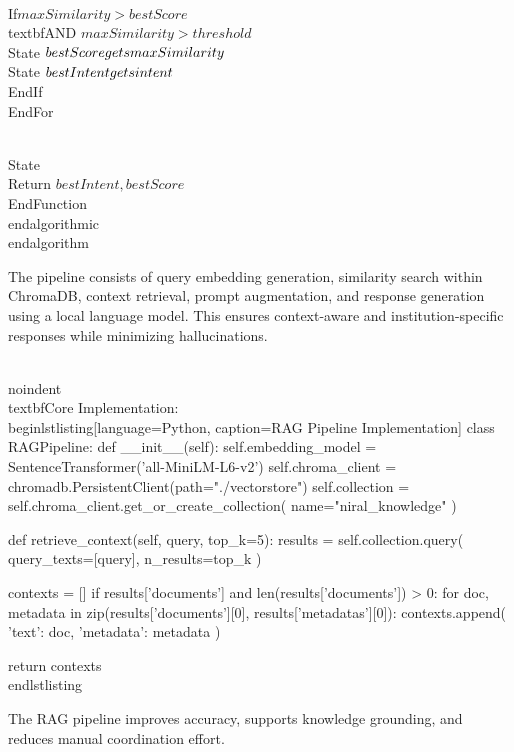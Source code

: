         \\If{$maxSimilarity > bestScore$ \\textbf{AND} $maxSimilarity > threshold$}
            \\State $bestScore \\gets maxSimilarity$
            \\State $bestIntent \\gets intent$
        \\EndIf
    \\EndFor
    
    \\State \\Return $bestIntent, bestScore$
\\EndFunction
\\end{algorithmic}
\\end{algorithm}

The pipeline consists of query embedding generation, similarity search within ChromaDB, context retrieval, prompt augmentation, and response generation using a local language model. This ensures context-aware and institution-specific responses while minimizing hallucinations.

\\noindent\\textbf{Core Implementation:}
\\begin{lstlisting}[language=Python, caption=RAG Pipeline Implementation]
class RAGPipeline:
    def __init__(self):
        self.embedding_model = SentenceTransformer('all-MiniLM-L6-v2')
        self.chroma_client = chromadb.PersistentClient(path="./vectorstore")
        self.collection = self.chroma_client.get_or_create_collection(
            name="niral_knowledge"
        )
    
    def retrieve_context(self, query, top_k=5):
        results = self.collection.query(
            query_texts=[query],
            n_results=top_k
        )
        
        contexts = []
        if results['documents'] and len(results['documents']) > 0:
            for doc, metadata in zip(results['documents'][0], results['metadatas'][0]):
                contexts.append({
                    'text': doc,
                    'metadata': metadata
                })
        
        return contexts
\\end{lstlisting}

The RAG pipeline improves accuracy, supports knowledge grounding, and reduces manual coordination effort.

